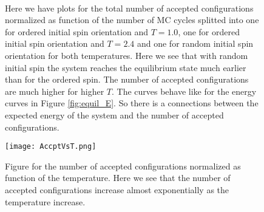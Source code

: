 \documentclass[12pt,a4paper,english]{article}
\begin{document}
\begin{figure}[htbp]
	\hspace{0.5em}
	\\
	\caption{Here we have plots for the total number of accepted configurations normalized as function of the number of MC cycles splitted into one for ordered initial spin orientation and $T=1.0$, one for ordered initial spin orientation and $T=2.4$ and one for random initial spin orientation for both temperatures. Here we see that with random initial spin the system reaches the equilibrium state much earlier than for the ordered spin. The number of accepted configurations are much higher for higher $T$. The curves behave like for the energy curves in Figure \ref{fig:equil_E}. So there is a connections between the expected energy of the system and the number of accepted configurations.\label{fig:equil_Nconfigs}}
\end{figure}

\begin{figure}[htbp]
	\centering\texttt{[image: AccptVsT.png]}
	\caption{Figure for the number of accepted configurations normalized as function of the temperature. Here we see that the number of accepted configurations increase almost exponentially as the temperature increase. \label{fig:acceptvsT}}
\end{figure}
\end{document}

